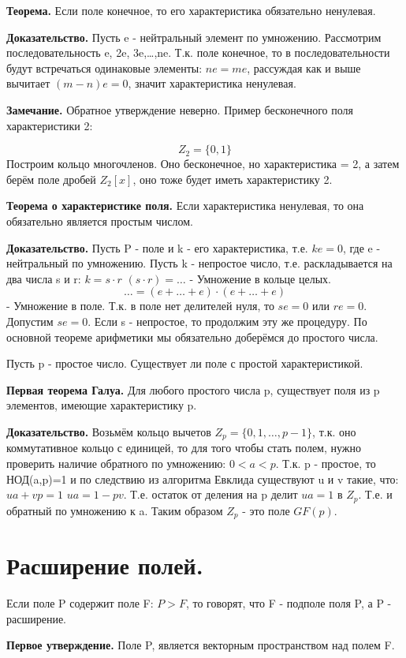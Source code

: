 \documentclass{article}
\begin{document}
{\bf Теорема.} Если поле конечное, то его характеристика обязательно ненулевая.

{\bf Доказательство.} Пусть e - нейтральный элемент по умножению. Рассмотрим последовательность e, 2e, 3e,\ldots,ne. Т.к. поле конечное, то в последовательности будут встречаться одинаковые элементы: $ne=me$, рассуждая как и выше вычитает $(m-n)e=0$, значит характеристика ненулевая.

{\bf Замечание.} Обратное утверждение неверно. Пример бесконечного поля характеристики 2:

$$Z_2=\{0,1\}$$ Построим кольцо многочленов. Оно бесконечное, но характеристика = 2, а затем берём поле дробей $Z_2[x]$, оно тоже будет иметь характеристику 2.

{\bf Теорема о характеристике поля.} Если характеристика ненулевая, то она обязательно является простым числом.

{\bf Доказательство.} Пусть P - поле и k - его характеристика, т.е. $ke=0$, где e - нейтральный по умножению. Пусть k - непростое число, т.е. раскладывается на два числа s и r: $k=s\cdot r$   $(s\cdot r)=\ldots$ - Умножение в кольце целых. $$\ldots=(e+\ldots+e)\cdot(e+\ldots+e)$$ - Умножение в поле. Т.к. в поле нет делителей нуля, то $se=0$ или $re=0$. Допустим $se=0$. Если s - непростое, то продолжим эту же процедуру. По основной теореме арифметики  мы обязательно доберёмся до простого числа.

Пусть p - простое число. Существует ли поле с простой характеристикой. 

{\bf Первая теорема Галуа.} Для любого простого числа p, существует поля из p элементов, имеющие характеристику p.

{\bf Доказательство.} Возьмём кольцо вычетов $Z_p=\{0,1,\ldots,p-1\}$, т.к. оно коммутативное кольцо с единицей, то для того чтобы стать полем, нужно проверить наличие обратного по умножению: $0<a<p$. Т.к. p - простое, то НОД(a,p)=1 и по следствию из алгоритма Евклида существуют u и v такие, что: $ua+vp=1$  $ua=1-pv$. Т.е. остаток от деления на p делит $ua=1$ в $Z_p$. Т.е. и обратный по умножению к a. Таким образом $Z_p$ - это поле $GF(p)$.

\section*{Расширение полей.}
Если поле P содержит поле F: $P>F$, то говорят, что F - подполе поля P, а P - расширение.

{\bf Первое утверждение.} Поле P, является векторным пространством над полем F.
\end{document}
